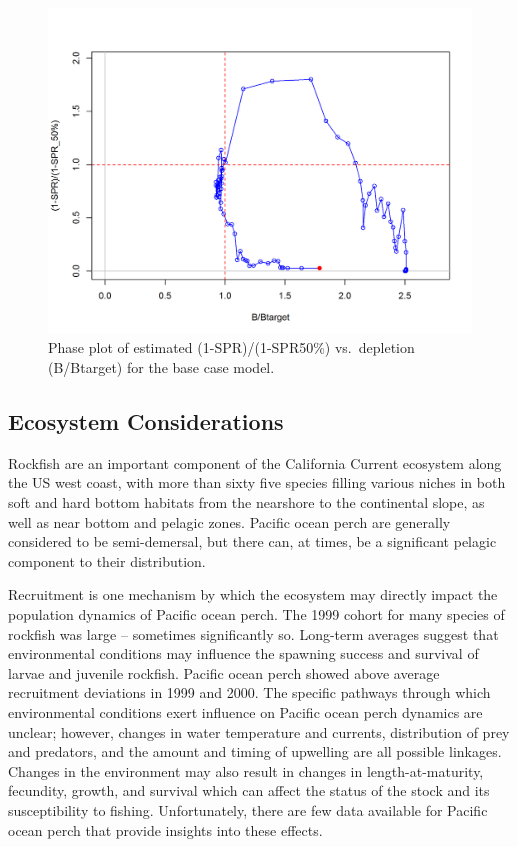 \documentclass[12pt,]{article}
\begin{document}
\begin{figure}
\centering
\includegraphics{r4ss/plots_mod1/SPR4_phase.png}
\caption{Phase plot of estimated (1-SPR)/(1-SPR50\%) vs.~depletion
(B/Btarget) for the base case model.\label{fig:Phase_all}}
\end{figure}

\FloatBarrier

\subsection*{Ecosystem Considerations}\label{ecosystem-considerations}

Rockfish are an important component of the California Current ecosystem
along the US west coast, with more than sixty five species filling
various niches in both soft and hard bottom habitats from the nearshore
to the continental slope, as well as near bottom and pelagic zones.
Pacific ocean perch are generally considered to be semi-demersal, but
there can, at times, be a significant pelagic component to their
distribution.

Recruitment is one mechanism by which the ecosystem may directly impact
the population dynamics of Pacific ocean perch. The 1999 cohort for many
species of rockfish was large -- sometimes significantly so. Long-term
averages suggest that environmental conditions may influence the
spawning success and survival of larvae and juvenile rockfish. Pacific
ocean perch showed above average recruitment deviations in 1999 and
2000. The specific pathways through which environmental conditions exert
influence on Pacific ocean perch dynamics are unclear; however, changes
in water temperature and currents, distribution of prey and predators,
and the amount and timing of upwelling are all possible linkages.
Changes in the environment may also result in changes in
length-at-maturity, fecundity, growth, and survival which can affect the
status of the stock and its susceptibility to fishing. Unfortunately,
there are few data available for Pacific ocean perch that provide
insights into these effects.
\end{document}
